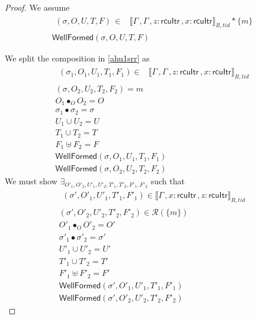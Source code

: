   \begin{proof}
  We assume
\begin{gather}\label{ahu1srr}
  \begin{aligned}
    (\sigma, O, U, T,F) \, \in & \llbracket \Gamma\,, \Gamma\,, z:\textsf{rcuItr}\, , x:\textsf{rcuItr}   \rrbracket_{R,tid} * \{m\}
    \end{aligned} \\
\textsf{WellFormed}(\sigma,O,U,T,F)
\label{ahu2srr}
\end{gather}

We split the composition in  \ref{ahu1srr} as 
\begin{gather} \label{ahu11srr}
  \begin{aligned}
    (\sigma_1, O_{1}, U_{1}, T_{1},F_1 ) \in & \llbracket \Gamma\,, \Gamma\,, z:\textsf{rcuItr}\, , x:\textsf{rcuItr} \rrbracket_{R,tid} \end{aligned}\\
  \label{ahu12srr}
(\sigma, O_{2}, U_{2}, T_{2},F_2) = m
\\
\label{ahu13srr}
O_{1} \bullet_{O} O_{2} = O
\\
\label{ahusigsrr}
\sigma_1 \bullet \sigma_2 = \sigma
\\
\label{ahu14srr}
U_{1} \cup U_{2} = U
\\
\label{ahu15srr}
T_{1} \cup T_{2} = T
\\
\label{ahusrrf}
F_1 \uplus F_2 = F
\\
\label{ahu16srr}
\textsf{WellFormed}(\sigma,O_{1},U_{1},T_{1},F_1)
\\
\label{ahu17srr}
\textsf{WellFormed}(\sigma,O_{2},U_{2},T_{2},F_2)
\end{gather}
We must show $\exists_{O'_{1}, O'_{2}, U'_{1}, U'_{2}, T'_{1}, T'_{2},F'_1,F'_2}$ such that
\begin{gather}\label{phu5srr}
\begin{aligned}
(\sigma',O'_{1},U'_{1}, T'_{1},F'_1)  \in\llbracket \Gamma\,, x:\textsf{rcuItr} \, , z:\textsf{rcuItr}   \rrbracket_{R,tid}
\end{aligned}\\
\label{phu6srr}
(\sigma',O'_{2},U'_{2}, T'_{2},F'_2) \in \mathcal{R}(\{m\})
\\
\label{phu7srr}
O'_{1} \bullet_{O} O'_{2} = O'
\\
\label{ahusigsrr'}
\sigma'_1 \bullet \sigma'_2 = \sigma'
\\
\label{phu8srr}
U'_{1} \cup U'_{2} = U'
\\
\label{phu9srr}
T'_{1} \cup T'_{2} = T'
\\
\label{phusrrf}
F'_1 \uplus F'_2 = F'
\\
\label{phu10srr}
\textsf{WellFormed}(\sigma',O'_{1},U'_{1},T'_{1},F'_1) \\
\label{phu11srr}
\textsf{WellFormed}(\sigma',O'_{2},U'_{2},T'_{2},F'_2)
\end{gather}


\end{proof}
